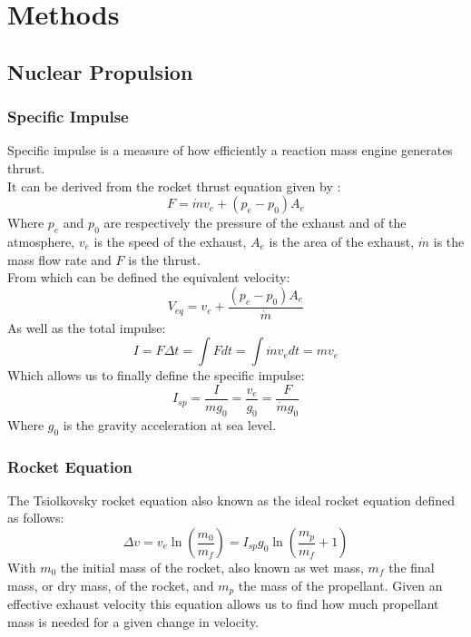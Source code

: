 \documentclass[12pt,a4paper]{report}
\begin{document}

\chapter{Methods}

\section{Nuclear Propulsion}
\subsection{Specific Impulse}
Specific impulse is a measure of how efficiently a reaction mass engine generates thrust.\\
It can be derived from the rocket thrust equation given by :
\begin{equation}
F = \dot{m}v_e + (p_e - p_0)A_e 
\end{equation}
Where $p_e$ and $p_0$ are respectively the pressure of the exhaust and of the atmosphere, $v_e$ is the speed of the exhaust, $A_e$ is the area of the exhaust, $\dot{m}$ is the mass flow rate and $F$ is the thrust.\\
From which can be defined the equivalent velocity:
$$V_{eq}=v_e+\frac{(p_e-p_0)A_e}{\dot{m}}$$
As well as the total impulse:
$$I=F\Delta t = \int F dt = \int \dot{m}v_{e}dt=mv_{e}$$
Which allows us to finally define the specific impulse:
\begin{equation}
I_{sp}=\frac{I}{mg_0}=\frac{v_{e}}{g_0}=\frac{F}{\dot{m}g_0}
\end{equation}
Where $g_0$ is the gravity acceleration at sea level.
\newpage
\subsection{Rocket Equation}

The Tsiolkovsky rocket equation also known as the ideal rocket equation defined as follows: 
\begin{equation}
\Delta v=v_e\ln\left(\frac{m_0}{m_f}\right)=I_{sp}g_0\ln\left(\frac{m_p}{m_f}+1\right)
\end{equation}
With $m_0$ the initial mass of the rocket, also known as wet mass, $m_f$ the final mass, or dry mass, of the rocket, and $m_p$ the mass of the propellant.
Given an effective exhaust velocity this equation allows us to find how much propellant mass is needed for a given change in velocity.
\end{document}
